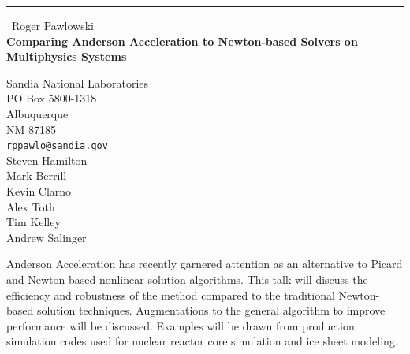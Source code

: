 \documentclass{report}
\begin{document}
\begin{center}
\rule{6in}{1pt} \
{\large Roger Pawlowski \\
{\bf Comparing Anderson Acceleration to Newton-based Solvers on Multiphysics Systems}}

Sandia National Laboratories \\ PO Box 5800-1318 \\ Albuquerque \\ NM 87185
\\
{\tt rppawlo@sandia.gov}\\
Steven Hamilton\\
Mark Berrill\\
Kevin Clarno\\
Alex Toth\\
Tim Kelley\\
Andrew Salinger\end{center}

Anderson Acceleration has recently garnered attention as an alternative
to Picard and Newton-based nonlinear solution algorithms. This talk will
discuss the efficiency and robustness of the method compared to the
traditional Newton-based solution techniques. Augmentations to the
general algorithm to improve performance will be discussed. Examples will
be drawn from production simulation codes used for nuclear reactor core
simulation and ice sheet modeling.
\end{document}
